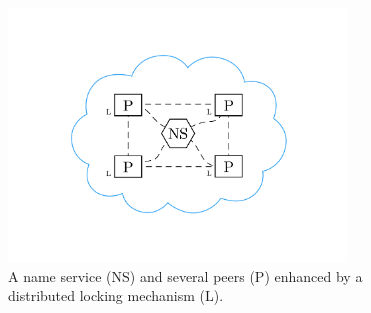\begin{figure}
  \centering
  \includegraphics[width=0.8\textwidth, clip=true, trim=0 180px 0 180px]{include/assets/lock.pdf}
  \caption{A name service (NS) and several peers (P) enhanced by a distributed locking mechanism (L).}
\end{figure}
